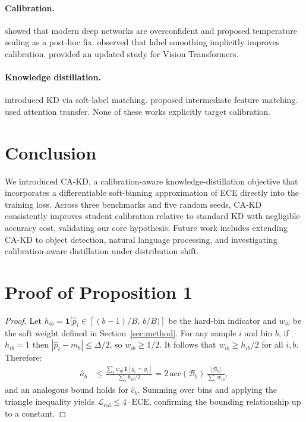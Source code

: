 \documentclass{article}
\newcommand{\cL}{\mathcal{L}}
\newcommand{\ECE}{\mathrm{ECE}}
\begin{document}
\paragraph{Calibration.}
\citet{guo2017calibration} showed that modern deep networks are overconfident and proposed
temperature scaling as a post-hoc fix.
\citet{muller2019does} observed that label smoothing implicitly improves calibration.
\citet{minderer2021revisiting} provided an updated study for Vision Transformers.

\paragraph{Knowledge distillation.}
\citet{hinton2015distilling} introduced KD via soft-label matching.
\citet{romero2014fitnets} proposed intermediate feature matching.
\citet{zagoruyko2016paying} used attention transfer.
None of these works explicitly target calibration.

\section{Conclusion}
\label{sec:conclusion}

We introduced CA-KD, a calibration-aware knowledge-distillation objective that incorporates a
differentiable soft-binning approximation of ECE directly into the training loss.
Across three benchmarks and five random seeds, CA-KD consistently improves student calibration
relative to standard KD with negligible accuracy cost, validating our core hypothesis.
Future work includes extending CA-KD to object detection, natural language processing, and
investigating calibration-aware distillation under distribution shift.




\appendix

\section{Proof of Proposition 1}
\label{app:proof}

\begin{proof}
Let $h_{ib} = \mathbf{1}[\hat{p}_i \in [(b-1)/B,\, b/B)]$ be the hard-bin indicator and
$w_{ib}$ be the soft weight defined in Section~\ref{sec:method}.
For any sample $i$ and bin $b$, if $h_{ib} = 1$ then $|\hat{p}_i - m_b| \leq \Delta/2$,
so $w_{ib} \geq 1/2$.
It follows that $w_{ib} \geq h_{ib}/2$ for all $i, b$.
Therefore:
\begin{align*}
  \hat{a}_b &\leq \frac{\sum_i w_{ib}\,\mathbf{1}[\hat{y}_i = y_i]}{\sum_i h_{ib}/2}
              = 2\,\mathrm{acc}(\mathcal{B}_b)\,\frac{|\mathcal{B}_b|}{\sum_i w_{ib}},
\end{align*}
and an analogous bound holds for $\hat{c}_b$.
Summing over bins and applying the triangle inequality yields
$\cL_\mathrm{cal} \leq 4 \cdot \ECE$, confirming the bounding relationship up to a constant.
\end{proof}
\end{document}
